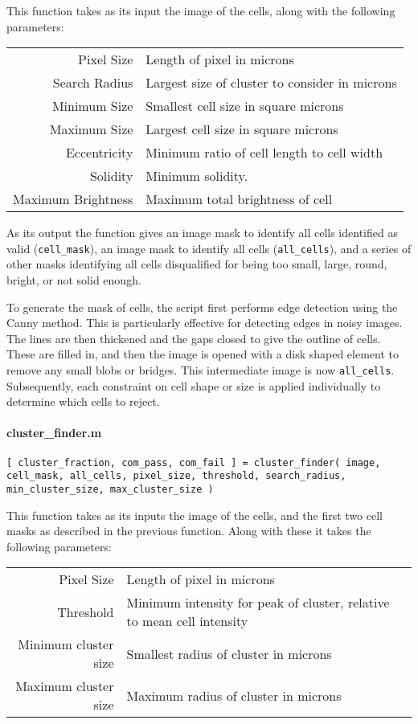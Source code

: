\documentclass[../main.tex]{subfiles}
\begin{document}
This function takes as its input the image of the cells, along with the following parameters:
\begin{tabular}{rl}
Pixel Size		&	Length of pixel in microns\\
Search Radius 	&	Largest size of cluster to consider in microns\\
Minimum Size		&	Smallest cell size in square microns\\
Maximum Size		&	Largest cell size in square microns\\
Eccentricity		&	Minimum ratio of cell length to cell width\\
Solidity			&	Minimum solidity\myfootnotemark.\\
Maximum Brightness	&	Maximum total brightness of cell
\end{tabular}


As its output the function gives an image mask to identify all cells identified as valid (\texttt{cell\_mask}), an image mask to identify all cells (\texttt{all\_cells}), and a series of other masks identifying all cells disqualified for being too small, large, round, bright, or not solid enough.

To generate the mask of cells, the script first performs edge detection using the Canny method\cite{canny}. This is particularly effective for detecting edges in noisy images. The lines are then thickened and the gaps closed to give the outline of cells. These are filled in, and then the image is opened with a disk shaped element to remove any small blobs or bridges. This intermediate image is now \texttt{all\_cells}. Subsequently, each constraint on cell shape or size is applied individually to determine which cells to reject.


\paragraph{cluster\_finder.m}
\texttt{[ cluster\_fraction, com\_pass, com\_fail ] = cluster\_finder( image, cell\_mask, all\_cells, pixel\_size, threshold, search\_radius, min\_cluster\_size, max\_cluster\_size ) }

This function takes as its inputs the image of the cells, and the first two cell masks as described in the previous function. Along with these it takes the following parameters:

\begin{tabular}{r|l}
Pixel Size		&	Length of pixel in microns\\
Threshold		&	Minimum intensity for peak of cluster, relative to mean cell intensity\\
Minimum cluster size	&	Smallest radius of cluster in microns\\
Maximum cluster size	&	Maximum radius of cluster in microns
\end{tabular}
\end{document}
